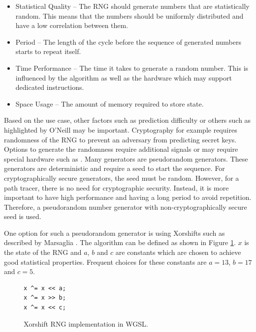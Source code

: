 \begin{itemize}
    \item{Statistical Quality} – The \gls{RNG} should generate numbers that are statistically random. This means that the numbers should be uniformly distributed and have a low correlation between them.
    \item{Period} – The length of the cycle before the sequence of generated numbers starts to repeat itself.
    \item{Time Performance} – The time it takes to generate a random number. This is influenced by the algorithm as well as the hardware which may support dedicated instructions.
    \item{Space Usage} – The amount of memory required to store state.
\end{itemize}

Based on the use case, other factors such as prediction difficulty or others such as highlighted by O’Neill \cite{o2014pcg} may be important. Cryptography for example requires randomness of the \gls{RNG} to prevent an adversary from predicting secret keys. Options to generate the randomness require additional signals \cite{randomnessCryptography} or may require special hardware such as  \cite{cloudflareLavaRand}. Many generators are pseudorandom generators. These generators are deterministic and require a seed to start the sequence. For cryptographically secure generators, the seed must be random.
However, for a path tracer, there is no need for cryptographic security. Instead, it is more important to have high performance and having a long period to avoid repetition. Therefore, a pseudorandom number generator with non-cryptographically secure seed is used.

One option for such a pseudorandom generator is using Xorshifts such as described by Marsaglia \cite{marsaglia2003xorshift}. The algorithm can be defined as shown in Figure \ref{code:xorShift}. $x$ is the state of the \gls{RNG} and $a$, $b$ and $c$ are constants which are chosen to achieve good statistical properties. Frequent choices for these constants are $a = 13$, $b = 17$ and $c = 5$.

\begin{figure}[H]
\begin{lstlisting}[style=wgsl]
x ^= x << a;
x ^= x >> b;
x ^= x << c;
\end{lstlisting}
\caption{Xorshift \gls{RNG} implementation in \gls{WGSL}.}
\label{code:xorShift}
\end{figure}

